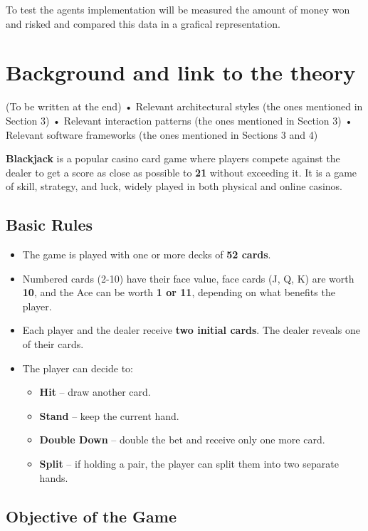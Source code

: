 To test the agents implementation will be measured the amount of money won and risked and compared this data in a grafical representation.

\chapter{Background and link to the theory}

(To be written at the end)
• Relevant architectural styles (the ones mentioned in Section 3)
• Relevant interaction patterns (the ones mentioned in Section 3)
• Relevant software frameworks (the ones mentioned in Sections 3 and 4)

\textbf{Blackjack} is a popular casino card game where players compete against the dealer to get a score as close as possible to \textbf{21} without exceeding it. It is a game of skill, strategy, and luck, widely played in both physical and online casinos.

\section{Basic Rules}

\begin{itemize}
    \item The game is played with one or more decks of \textbf{52 cards}.
    \item Numbered cards (2-10) have their face value, face cards (J, Q, K) are worth \textbf{10}, and the Ace can be worth \textbf{1 or 11}, depending on what benefits the player.
    \item Each player and the dealer receive \textbf{two initial cards}. The dealer reveals one of their cards.
    \item The player can decide to:
    \begin{itemize}
        \item \textbf{Hit} -- draw another card.
        \item \textbf{Stand} -- keep the current hand.
        \item \textbf{Double Down} -- double the bet and receive only one more card.
        \item \textbf{Split} -- if holding a pair, the player can split them into two separate hands.
    \end{itemize}
\end{itemize}

\section{Objective of the Game}

